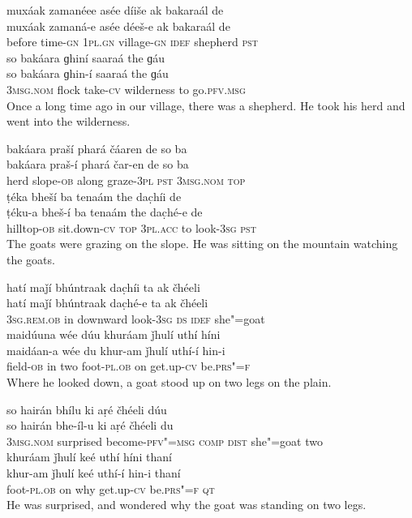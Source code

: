 \begin{exe}
\ex
\label{ex:1}
\glll muxáak	zamanéee	asée	díiše	ak	bakaraál	de \\
muxáak	zamaná-e	asée	déeš-e	ak	bakaraál	de \\
before	time-\textsc{gn} \textsc{1pl.gn}	village-\textsc{gn}	\textsc{idef}	shepherd	\textsc{pst} \\
\glll so	bakáara	ɡhiní	saaraá	the	ɡáu \\
so	bakáara	ɡhin-í	saaraá	the	ɡáu \\
\textsc{3msg.nom}	flock	take-\textsc{cv}	wilderness	to	go.\textsc{pfv.msg} \\
\glt Once a long time ago in our village, there was a shepherd. He took his herd and went into the wilderness.

\ex
\label{ex:2}
\glll bakáara	praší	phará	čáaren	de	so	ba \\
bakáara	praš-í	phará	čar-en	de	so	ba \\
herd	slope-\textsc{ob}	along	graze-\textsc{3pl} \textsc{pst} \textsc{3msg.nom}	\textsc{top} \\
\glll ṭéka	bheší	ba	tenaám	the	dac̣híi	de \\
ṭéku-a	bheš-í	ba	tenaám	the	dac̣hé-e	de \\
hilltop-\textsc{ob}	sit.down-\textsc{cv} \textsc{top}	\textsc{3pl.acc}	to	look-\textsc{3sg} \textsc{pst} \\
\glt The goats were grazing on the slope. He was sitting on the mountain watching the goats.

\ex
\label{ex:3}
\glll hatí	maǰí	bhúntraak	dac̣híi	ta	ak	čhéeli \\
hatí	maǰí	bhúntraak	dac̣hé-e	ta	ak	čhéeli \\
\textsc{3sg.rem.ob}	in	downward	look-\textsc{3sg} \textsc{ds} \textsc{idef}	she"=goat \\
\glll maidúuna	wée	dúu	khuráam	ǰhulí	uthí	híni \\
maidáan-a	wée	du	khur-am	ǰhulí	uthí-í	hin-i \\
field-\textsc{ob}	in	two	foot-\textsc{pl.ob}	on	get.up-\textsc{cv}	be.\textsc{prs"=f} \\
\glt Where he looked down, a goat stood up on two legs on the plain.

\ex
\label{ex:4}
\glll so	hairán	bhílu	ki	aṛé	čhéeli	dúu \\
so	hairán	bhe-íl-u	ki	aṛé	čhéeli	du \\
\textsc{3msg.nom}	surprised	become-\textsc{pfv"=msg}  \textsc{comp}	\textsc{dist}	she"=goat	two \\
\glll khuráam	ǰhulí	keé	uthí	híni	thaní \\
khur-am	ǰhulí	keé	uthí-í	hin-i	thaní \\
foot-\textsc{pl.ob}	on	why	get.up-\textsc{cv}	be.\textsc{prs"=f} \textsc{qt} \\
\glt He was surprised, and wondered why the goat was standing on two legs.


\end{exe}
